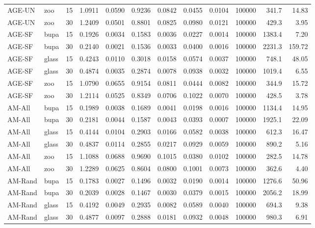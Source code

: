 \begin{longtable}{llcrrrrrrrrr}
    AGE-UN & zoo & 15 & 1.0911 & 0.0590 & 0.9236 & 0.0842 & 0.0455 & 0.0104 & 100000 & 341.7 & 14.83 \\
    AGE-UN & zoo & 30 & 1.2409 & 0.0501 & 0.8801 & 0.0825 & 0.0980 & 0.0121 & 100000 & 429.3 & 3.95 \\
    \midrule
    AGE-SF & bupa & 15 & 0.1926 & 0.0034 & 0.1583 & 0.0036 & 0.0227 & 0.0014 & 100000 & 1383.4 & 7.20 \\
    AGE-SF & bupa & 30 & 0.2140 & 0.0021 & 0.1536 & 0.0033 & 0.0400 & 0.0016 & 100000 & 2231.3 & 159.72 \\
    AGE-SF & glass & 15 & 0.4243 & 0.0110 & 0.3018 & 0.0158 & 0.0574 & 0.0037 & 100000 & 748.1 & 48.05 \\
    AGE-SF & glass & 30 & 0.4874 & 0.0035 & 0.2874 & 0.0078 & 0.0938 & 0.0032 & 100000 & 1019.4 & 6.55 \\
    AGE-SF & zoo & 15 & 1.0790 & 0.0655 & 0.9154 & 0.0811 & 0.0444 & 0.0082 & 100000 & 344.9 & 15.72 \\
    AGE-SF & zoo & 30 & 1.2114 & 0.0525 & 0.8349 & 0.0706 & 0.1022 & 0.0070 & 100000 & 428.5 & 3.78 \\
    \midrule
    AM-All & bupa & 15 & 0.1989 & 0.0038 & 0.1689 & 0.0041 & 0.0198 & 0.0016 & 100000 & 1134.4 & 14.95 \\
    AM-All & bupa & 30 & 0.2181 & 0.0044 & 0.1587 & 0.0043 & 0.0393 & 0.0007 & 100000 & 1925.1 & 22.09 \\
    AM-All & glass & 15 & 0.4144 & 0.0104 & 0.2903 & 0.0166 & 0.0582 & 0.0038 & 100000 & 612.3 & 16.47 \\
    AM-All & glass & 30 & 0.4837 & 0.0114 & 0.2855 & 0.0217 & 0.0929 & 0.0059 & 100000 & 890.2 & 5.16 \\
    AM-All & zoo & 15 & 1.1088 & 0.0688 & 0.9690 & 0.1015 & 0.0380 & 0.0102 & 100000 & 282.5 & 14.78 \\
    AM-All & zoo & 30 & 1.2289 & 0.0625 & 0.8604 & 0.0800 & 0.1001 & 0.0073 & 100000 & 362.6 & 4.40 \\
    \midrule
    AM-Rand & bupa & 15 & 0.1783 & 0.0027 & 0.1496 & 0.0032 & 0.0190 & 0.0014 & 100000 & 1276.6 & 50.96 \\
    AM-Rand & bupa & 30 & 0.2039 & 0.0028 & 0.1467 & 0.0030 & 0.0379 & 0.0015 & 100000 & 2056.2 & 18.99 \\
    AM-Rand & glass & 15 & 0.4192 & 0.0049 & 0.2935 & 0.0082 & 0.0589 & 0.0040 & 100000 & 694.3 & 9.38 \\
    AM-Rand & glass & 30 & 0.4877 & 0.0097 & 0.2888 & 0.0181 & 0.0932 & 0.0048 & 100000 & 980.3 & 6.91 \\

\end{longtable}
